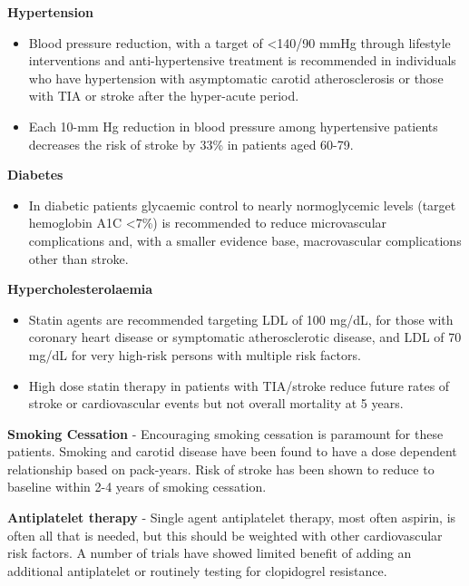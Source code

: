 \documentclass[
]{book}
\providecommand{\tightlist}{%
  \setlength{\itemsep}{0pt}\setlength{\parskip}{0pt}}
\begin{document}
\textbf{Hypertension}

\begin{itemize}
\item
  Blood pressure reduction, with a target of \textless140/90 mmHg through
  lifestyle interventions and anti-hypertensive treatment is
  recommended in individuals who have hypertension with asymptomatic
  carotid atherosclerosis or those with TIA or stroke after the
  hyper-acute period.
\item
  Each 10-mm Hg reduction in blood pressure among hypertensive
  patients decreases the risk of stroke by 33\% in patients aged
  60-79.\citep{aiyagari2009}
\end{itemize}

\textbf{Diabetes}

\begin{itemize}
\tightlist
\item
  In diabetic patients glycaemic control to nearly normoglycemic
  levels (target hemoglobin A1C \textless7\%) is recommended to reduce
  microvascular complications and, with a smaller evidence base,
  macrovascular complications other than stroke.\citep{ricotta}
\end{itemize}

\textbf{Hypercholesterolaemia}

\begin{itemize}
\item
  Statin agents are recommended targeting LDL of 100 mg/dL, for those
  with coronary heart disease or symptomatic atherosclerotic disease,
  and LDL of 70 mg/dL for very high-risk persons with multiple risk
  factors.
\item
  High dose statin therapy in patients with TIA/stroke reduce future
  rates of stroke or cardiovascular events but not overall mortality
  at 5 years. \citep{karamHighDoseAtorvastatinStroke2008}
\end{itemize}

\textbf{Smoking Cessation} - Encouraging smoking cessation is paramount for
these patients. Smoking and carotid disease have been found to have a
dose dependent relationship based on pack-years. Risk of stroke has been
shown to reduce to baseline within 2-4 years of smoking
cessation.\citep{hicks2015, kawachi1993, petrik1995, wilson1997}

\textbf{Antiplatelet therapy} - Single agent antiplatelet therapy, most often
aspirin, is often all that is needed, but this should be weighted with
other cardiovascular risk factors. A number of trials have showed
limited benefit of adding an additional antiplatelet or routinely
testing for clopidogrel resistance.\citep{ricotta}
\end{document}
